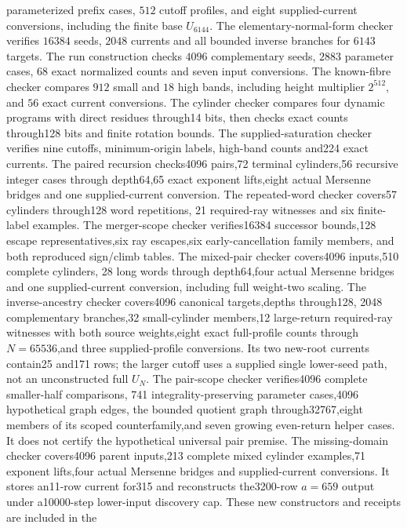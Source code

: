 \documentclass[11pt]{article}
\begin{document}
parameterized prefix cases, $512$ cutoff profiles, and eight
supplied-current conversions, including the finite base $U_{6144}$.
The elementary-normal-form checker verifies $16384$ seeds, $2048$
currents and all bounded inverse branches for $6143$ targets.
The run construction checks $4096$ complementary seeds, $2883$
parameter cases, $68$ exact normalized counts and seven input conversions.
The known-fibre checker compares $912$ small and $18$ high bands,
including height multiplier $2^{512}$, and $56$ exact current conversions.
The cylinder checker compares four dynamic programs with direct residues
through14 bits, then checks exact counts through128 bits and finite
rotation bounds. The supplied-saturation checker verifies nine cutoffs,
minimum-origin labels, high-band counts and224 exact currents.
The paired recursion checks4096 pairs,72 terminal cylinders,56 recursive
integer cases through depth64,65 exact exponent lifts,eight actual
Mersenne bridges and one supplied-current conversion.
The repeated-word checker covers57 cylinders through128 word repetitions,
21 required-ray witnesses and six finite-label examples.
The merger-scope checker verifies16384 successor bounds,128 escape
representatives,six ray escapes,six early-cancellation family members,
and both reproduced sign/climb tables.
The mixed-pair checker covers4096 inputs,510 complete cylinders,
28 long words through depth64,four actual Mersenne bridges and one
supplied-current conversion, including full weight-two scaling.
The inverse-ancestry checker covers4096 canonical targets,depths through128,
2048 complementary branches,32 small-cylinder members,12 large-return
required-ray witnesses with both source weights,eight exact full-profile
counts through $N=65536$,and three supplied-profile conversions.
Its two new-root currents contain25 and171 rows; the larger cutoff
uses a supplied single lower-seed path, not an unconstructed full $U_N$.
The pair-scope checker verifies4096 complete smaller-half comparisons,
741 integrality-preserving parameter cases,4096 hypothetical graph edges,
the bounded quotient graph through32767,eight members of its scoped
counterfamily,and seven growing even-return helper cases. It does not
certify the hypothetical universal pair premise.
The missing-domain checker covers4096 parent inputs,213 complete mixed
cylinder examples,71 exponent lifts,four actual Mersenne bridges and
supplied-current conversions. It stores an11-row current for315 and
reconstructs the3200-row $a=659$ output under a10000-step lower-input
discovery cap. These new constructors and receipts are included in the
\end{document}
